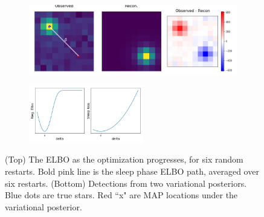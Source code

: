 \begin{figure}[!htb]
    \centering
    \begin{subfigure}[t]{0.9\textwidth}
    \centering
    \includegraphics[width=\textwidth]{figures/gradzero_cartoon.png}
    \end{subfigure}
    \begin{subfigure}[t]{\textwidth}
    \centering
    \includegraphics[width=0.55\textwidth]{figures/gradzero_cartoon2.png}
    \end{subfigure}
    \vspace{-3em}
    \caption{(Top) The ELBO as the optimization progresses, for six random restarts. Bold pink line is the sleep phase ELBO path, averaged over six restarts. (Bottom) Detections from two variational posteriors. Blue dots are true stars. Red ``x" are MAP locations under the variational posterior. }
    \label{fig:optim_path}
\end{figure}
